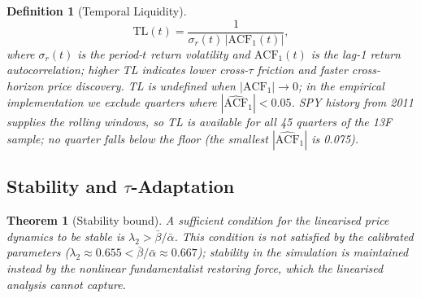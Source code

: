 \documentclass[preprint,12pt,authoryear]{elsarticle}
\newtheorem{theorem}{Theorem}
\newtheorem{definition}{Definition}
\begin{document}
\begin{definition}[Temporal Liquidity]\label{def:tl}
\[
  \mathrm{TL}(t) = \frac{1}{\sigma_r(t)\,|\mathrm{ACF}_1(t)|},
\]
where $\sigma_r(t)$ is the period-$t$ return volatility and
$\mathrm{ACF}_1(t)$ is the lag-1 return autocorrelation;
higher TL indicates lower cross-$\tau$ friction and faster cross-horizon
price discovery.
TL is undefined when $|\mathrm{ACF}_1| \to 0$; in the empirical
implementation we exclude quarters where $|\widehat{\mathrm{ACF}}_1| < 0.05$.
SPY history from 2011 supplies the rolling windows, so TL is available for
all 45 quarters of the 13F sample; no quarter falls below the floor (the
smallest $|\widehat{\mathrm{ACF}}_1|$ is 0.075).
\end{definition}

\subsection{Stability and $\tau$-Adaptation}

\begin{theorem}[Stability bound]\label{thm:stability}
A sufficient condition for the linearised price dynamics to be stable
is $\lambda_2 > \bar{\beta}/\bar{\alpha}$.
This condition is not satisfied by the calibrated parameters ($\lambda_2
\approx 0.655 < \bar{\beta}/\bar{\alpha} \approx 0.667$); stability in
the simulation is maintained instead by the nonlinear fundamentalist
restoring force, which the linearised analysis cannot capture.
\end{theorem}
\end{document}
